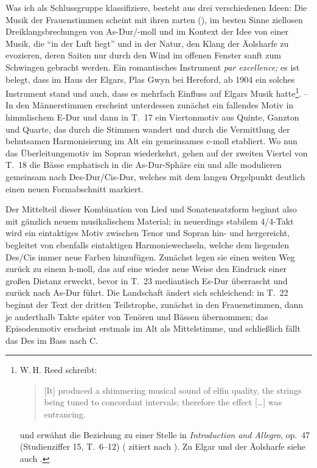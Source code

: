 \documentclass[a4paper,11pt,open=any]{scrbook}
\newcommand{\engquote}[1]{\foreignblockquote{english}{#1}}
\begin{document}
Was ich als Schlussgruppe klassifiziere, besteht aus drei verschiedenen Ideen:
Die Musik der Frauenstimmen scheint mit ihren zarten (),
im besten Sinne ziellosen Dreiklangsbrechungen von As-Dur/-moll und im
Kontext der Idee von einer Musik, die \enquote{in der Luft liegt} und in
der Natur, den Klang der Äolsharfe zu evozieren, deren Saiten nur durch
den Wind im offenen Fenster sanft zum Schwingen gebracht werden.  Ein
romantisches Instrument \textit{par excellence;} es ist belegt, dass im
Haus der Elgars, Plas Gwyn bei Hereford, ab 1904 ein solches Instrument
stand\cite[p. 443]{moore} und auch, dass es mehrfach Einfluss auf Elgars
Musik hatte\footnote{W.\,H. Reed schreibt: \engquote{[It] produced a
shimmering musical sound of elfin quality, the strings being tuned to
concordant intervals; therefore the effect […] was entrancing.} und erwähnt
die Beziehung zu einer Stelle in \textit{Introduction and Allegro}, op.~47
(Studienziffer 15, T.~6–12) (\cite[S.~147f.,]{reed} zitiert nach
\cite{hepokoski-gaudery}).  Zu Elgar und der Äolsharfe siehe auch
\cite{riley-nature}.}. – In den Männerstimmen erscheint unterdessen zunächst
ein fallendes Motiv in himmlischem E-Dur und dann in T.~17 ein Viertonmotiv
aus Quinte, Ganzton und Quarte, das durch die Stimmen wandert und durch die
Vermittlung der behutsamen Harmonisierung im Alt ein gemeinsames c-moll
etabliert.  Wo nun das Überleitungsmotiv im Sopran wiederkehrt, gehen auf
der zweiten Viertel von T.~18 die Bässe emphatisch in die As-Dur-Sphäre ein
und alle modulieren gemeinsam nach Des-Dur/Cis-Dur, welches mit dem langen
Orgelpunkt deutlich einen neuen Formabschnitt markiert.

Der Mittelteil dieser Kombination von Lied und Sonatensatzform beginnt also
mit gänzlich neuem musikalischem Material; in neuerdings stabilem 4/4-Takt
wird ein eintaktiges Motiv zwischen Tenor und Sopran hin- und hergereicht,
begleitet von ebenfalls eintaktigen Harmoniewechseln, welche dem liegenden
\textsf{Des/Cis} immer neue Farben hinzufügen.  Zunächst legen sie einen
weiten Weg zurück zu einem h-moll, das auf eine wieder neue Weise den
Eindruck einer großen Distanz erweckt, bevor in T.~23 mediantisch Es-Dur
überrascht und zurück nach As-Dur führt.  Die Landschaft ändert sich
schleichend: in T.~22 beginnt der Text der dritten Teilstrophe, zunächst
in den Frauenstimmen, dann je anderthalb Takte später von Tenören und
Bässen übernommen; das Episodenmotiv erscheint erstmals im Alt als
Mittelstimme, und schließlich fällt das \textsf{Des} im Bass nach
\textsf{C}.
\end{document}
